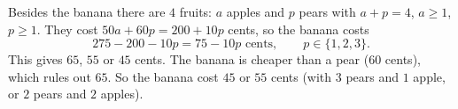 Besides the banana there are $4$ fruits: $a$ apples and $p$ pears with $a+p=4$, $a\ge1$, $p\ge1$. They cost $50a+60p=200+10p$ cents, so the banana costs
\[
275-200-10p=75-10p \text{ cents},\qquad p\in\{1,2,3\}.
\]
This gives $65$, $55$ or $45$ cents. The banana is cheaper than a pear ($60$ cents), which rules out $65$. So the banana cost $\boxed{45\text{ or }55}$ cents (with $3$ pears and $1$ apple, or $2$ pears and $2$ apples).
